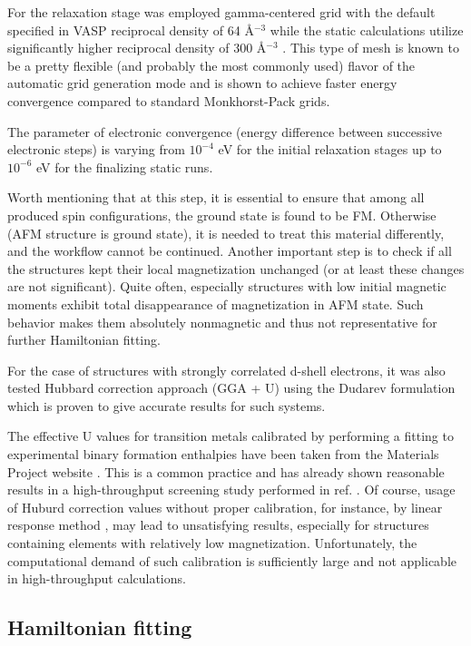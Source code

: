 For the relaxation stage was employed gamma-centered grid with the default specified in VASP reciprocal density of 64 \AA $^{−3}$ while the static calculations utilize significantly higher reciprocal density of 300 \AA $^{−3}$ . This type of mesh is known to be a pretty flexible (and probably the most commonly used) flavor of the automatic grid generation mode and is shown to achieve faster energy convergence compared to standard Monkhorst-Pack grids.

The parameter of electronic convergence (energy difference between successive electronic steps) is varying from $10^{-4}$ eV for the initial relaxation stages up to  $10^{-6}$ eV for the finalizing static runs.

Worth mentioning that at this step, it is essential to ensure that among all produced spin configurations, the ground state is found to be FM. Otherwise (AFM structure is ground state), it is needed to treat this material differently, and the workflow cannot be continued.  Another important step is to check if all the structures kept their local magnetization unchanged (or at least these changes are not significant). Quite often, especially structures with low initial magnetic moments exhibit total disappearance of magnetization in AFM state. Such behavior makes them absolutely nonmagnetic and thus not representative for further Hamiltonian fitting.

For the case of structures with strongly correlated d-shell electrons, it was also tested Hubbard correction approach (GGA + U) using the Dudarev \cite{Dudarev_1998} formulation which is proven to give accurate results for such systems.  

The effective U values for transition metals calibrated by performing a fitting to experimental binary formation enthalpies have been taken from the Materials Project website \cite{Wang_2006}.
This is a common practice and has already shown reasonable results in a high-throughput screening study performed in ref. \cite{Zhu_2018}. 
Of course, usage of Huburd correction values without proper calibration, for instance, by linear response method \cite{Cococcioni_2005},  may lead to unsatisfying results, especially for structures containing elements with relatively low magnetization. Unfortunately, the computational demand of such calibration is sufficiently large and not applicable in high-throughput calculations.


\subsection{Hamiltonian fitting}

